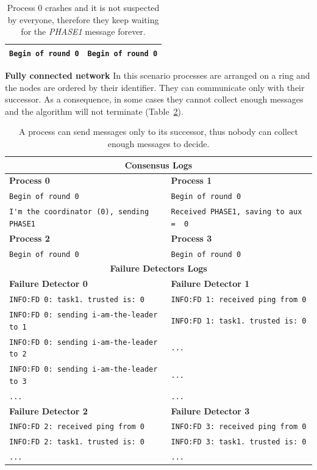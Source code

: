 \documentclass[a4paper]{article}
\begin{document}
\begin{compactitem}
\begin{table}[H]
\begin{tabular}{ll}
		\midrule
        \verb|Begin of round 0| & \verb|Begin of round 0| \\
        \bottomrule
        \end{tabular}
        \caption{\small{Process $0$ crashes and it is not suspected by everyone, therefore they keep waiting for the \emph{PHASE1} message forever. }}
        \label{table:failure_detector}
	\end{table}
  \item \textbf{Fully connected network} In this scenario processes are arranged on a ring and the nodes are ordered by their identifier. They can communicate only with their successor. As a consequence, in some cases they cannot collect enough messages and the algorithm will not terminate (Table~\ref{table:fully_connected}).
  	\begin{table}[H]
		\centering\scriptsize
        \begin{tabular}{ll}
		\toprule
        \multicolumn{2}{c}{\textbf{Consensus Logs}} \\
        \midrule
		\textbf{Process 0} & \textbf{Process 1} \\
		\midrule
        \verb|Begin of round 0| & \verb|Begin of round 0| \\
		\verb|I'm the coordinator (0), sending PHASE1| & \verb|Received PHASE1, saving to aux =  0| \\
        \midrule
		\textbf{Process 2} & \textbf{Process 3} \\
		\midrule
        \verb|Begin of round 0| & \verb|Begin of round 0| \\
        \bottomrule\toprule
		\multicolumn{2}{c}{\textbf{Failure Detectors Logs}} \\
		\midrule
		\textbf{Failure Detector 0} & \textbf{Failure Detector 1} \\
		\midrule
		\verb|INFO:FD 0: task1. trusted is: 0| & \verb|INFO:FD 1: received ping from 0| \\
		\verb|INFO:FD 0: sending i-am-the-leader to 1| & \verb|INFO:FD 1: task1. trusted is: 0| \\
		\verb|INFO:FD 0: sending i-am-the-leader to 2| & \verb|...| \\
		\verb|INFO:FD 0: sending i-am-the-leader to 3| & \verb|...| \\
		\verb|...| & \verb|...| \\
        \midrule
		\textbf{Failure Detector 2} & \textbf{Failure Detector 3} \\
		\midrule
        \verb|INFO:FD 2: received ping from 0| & \verb|INFO:FD 3: received ping from 0| \\
		\verb|INFO:FD 2: task1. trusted is: 0| & \verb|INFO:FD 3: task1. trusted is: 0| \\
		\verb|...| & \verb|...| \\
        \bottomrule
        \end{tabular}
        \caption{\small{A process can send messages only to its successor, thus nobody can collect enough messages to decide. }}
        \label{table:fully_connected}
	\end{table}
\end{compactitem}
\end{document}
